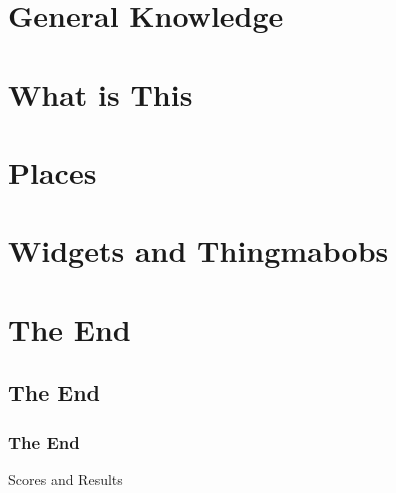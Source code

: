 \documentclass[t,compress,aspectratio=169]{beamer}
\begin{document}
\section{General Knowledge}


\section{What is This}


\section{Places}


\section{Widgets and Thingmabobs}





\section{The End}
\subsection{The End}
\begin{frame}
    \frametitle{The End}
    \vspace{0.3cm}
    \begin{block}{}
        \centering\begin{Huge}Scores and Results\end{Huge}
    \end{block}
\end{frame}


% 
% 
\end{document}
